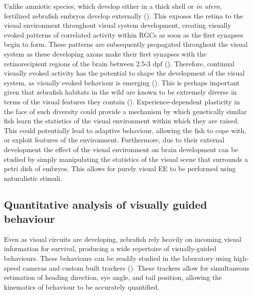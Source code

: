 Unlike amniotic species, which develop either in a thick shell or \textit{in utero}, fertilized zebrafish embryos develop externally (\cite{Pratt2016AnDevelopment}). This exposes the retina to the visual environment throughout visual system development, creating visually evoked patterns of correlated activity within RGCs as soon as the first synapses begin to form. These patterns are subsequently propagated throughout the visual system as these developing axons make their first synapses with the retinorecipient regions of the brain between 2.5-3 dpf (\cite{Niell2005FunctionalTectum}). Therefore, continual visually evoked activity has the potential to shape the development of the visual system, as visually evoked behaviour is emerging (\cite{Easter1996TheRerio, Orger2017ZebrafishChallenges}). This is perhaps important given that zebrafish habitats in the wild are known to be extremely diverse in terms of the visual features they contain (\cite{Engeszer2007ZebrafishField}).  Experience-dependent plasticity in the face of such diversity could provide a mechanism by which genetically similar fish learn the statistics of the visual environment within which they are raised. This could potentially lead to adaptive behaviour, allowing the fish to cope with, or exploit features of the environment. Furthermore, due to their external development the effect of the visual environment on brain development can be studied by simply manipulating the statistics of the visual scene that surrounds a petri dish of embryos. This allows for purely visual EE to be performed using naturalistic stimuli.

\subsection{Quantitative analysis of visually guided behaviour}

Even as visual circuits are developing, zebrafish rely heavily on incoming visual information for survival, producing a wide repertoire of visually-guided behaviours. These behaviours can be readily studied in the laboratory using high-speed cameras and custom built trackers (\cite{Orger2017ZebrafishChallenges}). These trackers allow for simultaneous estimation of heading direction, eye angle, and tail position, allowing the kinematics of behaviour to be accurately quantified. 

